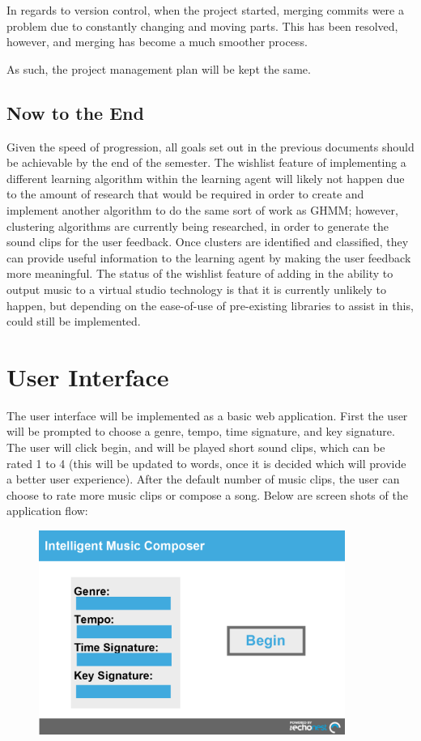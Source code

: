 \documentclass{article}
\begin{document}
In regards to version control, when the project started, merging commits were a problem due to constantly 
changing and moving parts. This has been resolved, however, and merging has become a much smoother process.

As such, the project management plan will be kept the same.

\subsection{Now to the End}
Given the speed of progression, all goals set out in the previous documents should be achievable
by the end of the semester. The wishlist feature of implementing a different learning algorithm
within the learning agent will likely not happen due to the amount of research that would be 
required in order to create and implement another algorithm to do the same sort of work as GHMM; 
however, clustering algorithms are currently being researched, in order to generate the sound 
clips for the user feedback. Once clusters are identified and classified, they can provide useful 
information to the learning agent by making the user feedback more meaningful. The status of the 
wishlist feature of adding in the ability to output music to a virtual studio technology is that 
it is currently unlikely to happen, but depending on the ease-of-use of pre-existing libraries 
to assist in this, could still be implemented.

\section{User Interface}
The user interface will be implemented as a basic web application. First the user will be prompted 
to choose a genre, tempo, time signature, and key signature.  The user will click begin, and will 
be played short sound clips, which can be rated 1 to 4 (this will be updated to words, once it is 
decided which will provide a better user experience).  After the default number of music clips, the 
user can choose to rate more music clips or compose a song.  
Below are screen shots of the application flow:

\begin{figure}[H]
\centerline{\includegraphics[width=10cm]{begin.png}}
\end{figure}
\end{document}
